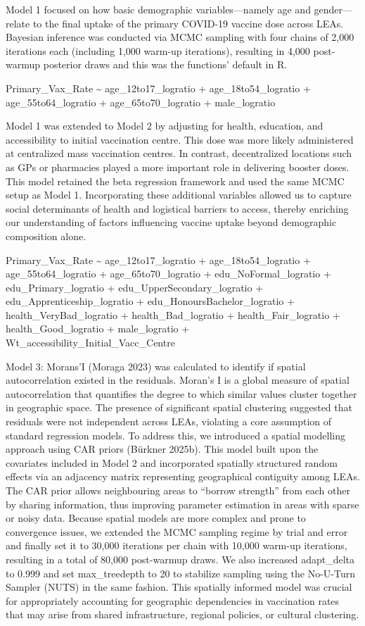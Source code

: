 \documentclass{article}
\begin{document}
Model 1 focused on how basic demographic variables---namely age and
gender---relate to the final uptake of the primary COVID-19 vaccine dose
across LEAs. Bayesian inference was conducted via MCMC sampling with
four chains of 2,000 iterations each (including 1,000 warm-up
iterations), resulting in 4,000 post-warmup posterior draws and this was
the functions' default in R.

Primary\_Vax\_Rate \textasciitilde{} age\_12to17\_logratio +
age\_18to54\_logratio + age\_55to64\_logratio + age\_65to70\_logratio +
male\_logratio

Model 1 was extended to Model 2 by adjusting for health, education, and
accessibility to initial vaccination centre. This dose was more likely
administered at centralized mass vaccination centres. In contrast,
decentralized locations such as GPs or pharmacies played a more
important role in delivering booster doses. This model retained the beta
regression framework and used the same MCMC setup as Model 1.
Incorporating these additional variables allowed us to capture social
determinants of health and logistical barriers to access, thereby
enriching our understanding of factors influencing vaccine uptake beyond
demographic composition alone.

Primary\_Vax\_Rate \textasciitilde{} age\_12to17\_logratio +
age\_18to54\_logratio + age\_55to64\_logratio + age\_65to70\_logratio +
edu\_NoFormal\_logratio + edu\_Primary\_logratio +
edu\_UpperSecondary\_logratio + edu\_Apprenticeship\_logratio +
edu\_HonoursBachelor\_logratio + health\_VeryBad\_logratio +
health\_Bad\_logratio + health\_Fair\_logratio + health\_Good\_logratio
+ male\_logratio + Wt\_accessibility\_Initial\_Vacc\_Centre

Model 3: Morans'I (Moraga 2023) was calculated to identify if spatial
autocorrelation existed in the residuals. Moran's I is a global measure
of spatial autocorrelation that quantifies the degree to which similar
values cluster together in geographic space. The presence of significant
spatial clustering suggested that residuals were not independent across
LEAs, violating a core assumption of standard regression models. To
address this, we introduced a spatial modelling approach using CAR
priors (Bürkner 2025b). This model built upon the covariates included in
Model 2 and incorporated spatially structured random effects via an
adjacency matrix representing geographical contiguity among LEAs. The
CAR prior allows neighbouring areas to ``borrow strength'' from each
other by sharing information, thus improving parameter estimation in
areas with sparse or noisy data. Because spatial models are more complex
and prone to convergence issues, we extended the MCMC sampling regime by
trial and error and finally set it to 30,000 iterations per chain with
10,000 warm-up iterations, resulting in a total of 80,000 post-warmup
draws. We also increased adapt\_delta to 0.999 and set max\_treedepth to
20 to stabilize sampling using the No-U-Turn Sampler (NUTS) in the same
fashion. This spatially informed model was crucial for appropriately
accounting for geographic dependencies in vaccination rates that may
arise from shared infrastructure, regional policies, or cultural
clustering.
\end{document}
